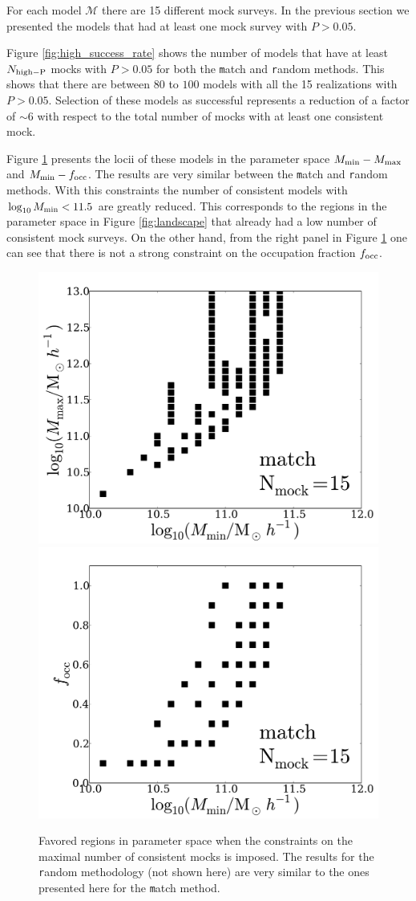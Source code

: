 \documentclass[usenatbib]{mn2e}
\begin{document}
For each model ${\mathcal M}$ there are 15 different mock surveys. In the
previous section we presented the models that had at least one
mock survey with $P>0.05$.

Figure \ref{fig:high_success_rate} shows the number of models
that have at least $N_{\rm high-P}$ mocks with $P>0.05$ for both the
{\texttt  match} and {\texttt random} methods.  This shows that there
are between $80$ to $100$ models with all the 15 realizations with
$P>0.05$. Selection of these models as successful represents a
reduction of a factor of $\sim 6$ with respect to the total number of
mocks with at least one consistent mock.  

Figure \ref{fig:restriction_mock} presents the locii of these models
in the parameter space $M_{\rm min}-M_{\rm max}$ and $M_{\rm
  min}-f_{\rm occ}$. The results are very similar between the {\texttt
  match} and {\texttt random} methods. With this constraints the
number of consistent models with  $\log_{10}M_{\rm min}< 11.5$ are
greatly reduced. This corresponds to the regions in the parameter
space in Figure \ref{fig:landscape} that already had a low number of
consistent mock surveys. On the other hand, from the right panel in
Figure \ref{fig:restriction_mock} one can see that there is not a
strong constraint on the occupation fraction $f_{\rm occ}$.

\begin{figure}
\begin{center}
\includegraphics[width=0.46\linewidth,angle=0]{./plots/Fig5_match_mass_mock.pdf} 
\hspace{5mm}
\includegraphics[width=0.46\linewidth,angle=0]{./plots/Fig5_match_f_occ_mock.pdf}
\end{center}  
\caption{Favored regions in parameter space when the constraints on
  the maximal number of consistent mocks is imposed. The results for
  the {\texttt random} methodology (not shown here) are very similar to the ones
  presented here for the {\texttt match} method.
  \label{fig:restriction_mock}}  
\end{figure}
\end{document}
